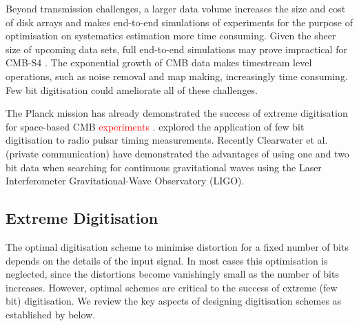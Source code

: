 \documentclass[apj]{emulateapj}
\newcommand{\changed}[1]{\textcolor{Red}{#1}}
\begin{document}


Beyond transmission challenges, a larger data volume increases the size and cost of disk arrays and makes end-to-end simulations of experiments for the purpose of optimisation on systematics estimation more time consuming. Given the sheer size of upcoming data sets, full end-to-end simulations may prove impractical for CMB-S4 \citep{s4sciencebook}. The exponential growth of CMB data makes timestream level operations, such as noise removal and map making, increasingly time consuming. Few bit digitisation could ameliorate all of these challenges.



The Planck mission has already demonstrated the success of extreme digitisation for space-based CMB \changed{experiments} \citep{maris2003}. \cite{jenet1998} explored the application of few bit digitisation to radio pulsar timing measurements. Recently Clearwater et al. (private communication) have demonstrated the advantages of using one and two bit data when searching for continuous gravitational waves using the Laser Interferometer Gravitational-Wave Observatory (LIGO).


\subsection{Extreme Digitisation}
\label{subsec:extremedigitisation}

The optimal digitisation scheme to minimise distortion for a fixed number of bits depends on the details of the input signal. 
In most cases this optimisation is neglected, since the distortions become vanishingly small as the number of bits increases. However, optimal schemes are critical to the success of extreme (few bit) digitisation. We review the key aspects of designing digitisation schemes as established by \cite{max1960} below.
\end{document}
